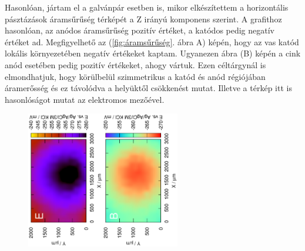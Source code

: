 Hasonlóan, jártam el a galvánpár esetben is, mikor elkészítettem a horizontális pásztázások áramsűrűség térképét a Z irányú komponens szerint. A grafithoz hasonlóan, az anódos áramsűrűség pozitív értéket, a katódos pedig negatív értéket ad. Megfigyelhető az (\ref{fig:áramsűrűség}. ábra A) képén, hogy az vas katód lokális környezetében negatív értékeket kaptam. Ugyanezen ábra (B) képén a cink anód esetében pedig pozitív értékeket, ahogy vártuk. Ezen céltárgynál is elmondhatjuk, hogy körülbelül szimmetrikus a katód és anód régiójában áramerősség és ez távolódva a helyüktől csökkenést mutat. Illetve a térkép itt is hasonlóságot mutat az elektromos mezőével.


\begin{figure}
\centering
\includegraphics[width=0.3\textwidth, angle=-90]{img/mérések/Fe_h_100.eps}\includegraphics[width=0.3\textwidth, angle=-90]{img/mérések/Fe_h_500.eps}


\end{figure}
